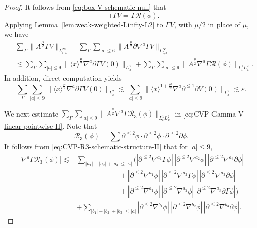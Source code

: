 \documentclass[11pt,twoside]{article}
\def\ds{\displaystyle}
\def\p{\partial}
\def\ve{\varepsilon}
\def\ls{\lesssim}
\theoremstyle{plain}
\theoremstyle{definition}
\theoremstyle{assumption}
\numberwithin{equation}{section}
\begin{document}
	\begin{proof}
		It follows from  \eqref{eq:box-V-schematic-null} that
		\begin{equation}
			\label{eq:CVP-Gamma-V-equation-pointwise-II}
			\Box\Gamma V
			=\Gamma\mathcal R(\phi).
		\end{equation}
		Applying Lemma~\ref{lem:weak-weighted-Linfty-L2} to \(\Gamma V\), with
		\(\mu/2\) in place of \(\mu\), we have
		\begin{equation}\label{eq:CVP-Gamma-V-linear-pointwise-II}
			\begin{aligned}
				&\sum_{\Gamma}
				\big\|
				A^{\frac{\mu}{2}}\Gamma V
				\big\|_{L^\infty_{t,x}}
				+
				\sum_{\Gamma}
				\sum_{|a|\le 6}
				\big\|
				A^{\frac{\mu}{2}}
				\p\nabla^a\Gamma V
				\big\|_{L^\infty_{t,x}}
				\\
				&\ls
				\sum_{\Gamma}
				\sum_{|a|\le 9}
				\big\|
				\langle x\rangle^{\frac{\mu}{2}}
				\nabla^a\p\Gamma V(0)
				\big\|_{L^2_x}
				+
				\sum_{\Gamma}
				\sum_{|a|\le 9}
				\big\|
				A^{\frac{\mu}{2}}
				\nabla^a\Gamma\mathcal R(\phi)
				\big\|_{L^1_tL^2_x}.
			\end{aligned}
		\end{equation}
		In addition, direct computation yields
		\begin{equation}
			\label{eq:CVP-Gamma-V-initial-pointwise-II}
			\sum_{\Gamma}
			\sum_{|a|\le 9}
			\big\|
			\langle x\rangle^{\frac{\mu}{2}}
			\nabla^a\p\Gamma V(0)
			\big\|_{L^2_x}
			\ls
			\sum_{|a|\le 9}
			\big\|
			\langle x\rangle^{1+\frac{\mu}{2}}
			\nabla^a\p^{\le 1}\p V(0)
			\big\|_{L^2_x}
			\ls\ve.
		\end{equation}
		
		We next estimate $\ds\sum_{\Gamma}
		\sum_{|a|\le 9}\big\|A^{\frac{\mu}{2}}
		\nabla^a\Gamma\mathcal R_3(\phi)
		\big\|_{L^1_tL^2_x}$ in \eqref{eq:CVP-Gamma-V-linear-pointwise-II}.
		Note that
		\begin{equation}
			\label{eq:CVP-R3-schematic-structure-II}
			\mathcal R_3(\phi)
			=\sum
			\p^{\le2}\phi\cdot
			\p^{\le2}\phi\cdot
			\p^{\le2}\p\phi.
		\end{equation}
		It follows from \eqref{eq:CVP-R3-schematic-structure-II} that  for \(|a|\le 9\),
		\begin{equation}
			\label{eq:CVP-Gamma-R3-schematic-Leibniz-II}
			\begin{aligned}
				|\nabla^a\Gamma\mathcal R_3(\phi)|
				\ls
				&\sum_{|a_1|+|a_2|+|a_3|\le |a|}
				\Big(
				|\p^{\le2}\nabla^{a_1}\Gamma\phi|\,
				|\p^{\le2}\nabla^{a_2}\phi|\,
				|\p^{\le2}\nabla^{a_3}\p\phi|
				\\
				&\qquad\qquad\qquad +
				|\p^{\le2}\nabla^{a_1}\phi|\,
				|\p^{\le2}\nabla^{a_2}\Gamma\phi|\,
				|\p^{\le2}\nabla^{a_3}\p\phi|
				\\
				&\qquad\qquad\qquad +
				|\p^{\le2}\nabla^{a_1}\phi|\,
				|\p^{\le2}\nabla^{a_2}\phi|\,
				|\p^{\le2}\nabla^{a_3}\p\Gamma\phi|
				\Big)
				\\
				&+
				\sum_{|b_1|+|b_2|+|b_3|\le |a|}
				|\p^{\le2}\nabla^{b_1}\phi|\,
				|\p^{\le2}\nabla^{b_2}\phi|\,
				|\p^{\le2}\nabla^{b_3}\p\phi|.
			\end{aligned}
		\end{equation}
		

\end{proof}
\end{document}
